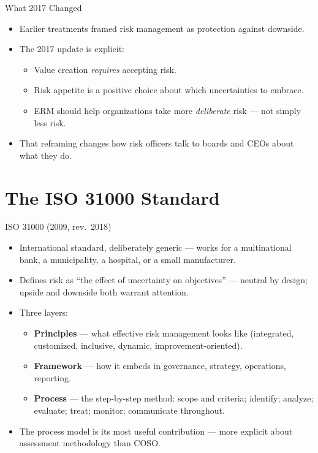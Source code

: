 \documentclass[11pt, aspectratio=169]{beamer}
\begin{document}
\begin{frame}{What 2017 Changed}
\begin{itemize}
  \item Earlier treatments framed risk management as protection against downside.
  \item The 2017 update is explicit:
  \begin{itemize}
    \item Value creation \emph{requires} accepting risk.
    \item Risk appetite is a \alert{positive choice} about which uncertainties to embrace.
    \item ERM should help organizations take more \emph{deliberate} risk --- not simply less risk.
  \end{itemize}
  \item That reframing changes how risk officers talk to boards and CEOs about what they do.
\end{itemize}
\end{frame}

\section{The ISO 31000 Standard}

\begin{frame}{ISO 31000 (2009, rev.\ 2018)}
\begin{itemize}
  \item International standard, deliberately generic --- works for a multinational bank, a municipality, a hospital, or a small manufacturer.
  \item Defines risk as \alert{``the effect of uncertainty on objectives''} --- neutral by design; upside and downside both warrant attention.
  \item Three layers:
  \begin{itemize}
    \item \textbf{Principles} --- what effective risk management looks like (integrated, customized, inclusive, dynamic, improvement-oriented).
    \item \textbf{Framework} --- how it embeds in governance, strategy, operations, reporting.
    \item \textbf{Process} --- the step-by-step method: scope and criteria; identify; analyze; evaluate; treat; monitor; communicate throughout.
  \end{itemize}
  \item The \alert{process model} is its most useful contribution --- more explicit about assessment methodology than COSO.
\end{itemize}
\end{frame}
\end{document}
